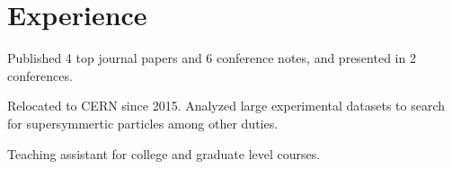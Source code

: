 \documentclass[letterpaper]{deedy-resume-openfont}
\begin{document}





\section{Experience}

\begin{tightemize}
\item Published 4 top journal papers and 6 conference notes, and presented in 2 conferences.
\item Relocated to CERN since 2015. Analyzed large experimental datasets to search for supersymmertic particles among other duties.
\item Teaching assistant for college and graduate level courses.
\end{tightemize}
\sectionsep
\end{document}
